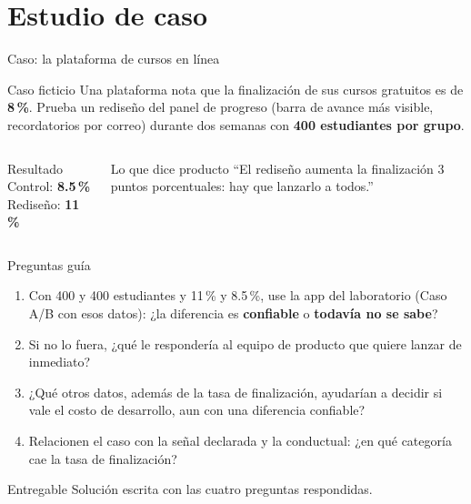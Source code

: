 \documentclass[aspectratio=169,xcolor=dvipsnames]{beamer}
\begin{document}
\section[Caso]{Estudio de caso}

\begin{frame}{Caso: la plataforma de cursos en línea}
\begin{exampleblock}{Caso ficticio}
  Una plataforma nota que la finalización de sus cursos gratuitos es de \textbf{8\,\%}. Prueba un rediseño del panel de progreso (barra de avance más visible, recordatorios por correo) durante dos semanas con \textbf{400 estudiantes por grupo}.
\end{exampleblock}
\begin{columns}[T]
  \begin{block}{Resultado}
    \small Control: \textbf{8.5\,\%}\\ Rediseño: \textbf{11\,\%}
  \end{block}
  \begin{alertblock}{Lo que dice producto}
    \small \enquote{El rediseño aumenta la finalización 3 puntos porcentuales: hay que lanzarlo a todos.}
  \end{alertblock}
\end{columns}
\end{frame}

\begin{frame}{Preguntas guía}
\small
\begin{enumerate}
  \item Con 400 y 400 estudiantes y 11\,\% y 8.5\,\%, use la app del laboratorio (Caso A/B con esos datos): ¿la diferencia es \textbf{confiable} o \textbf{todavía no se sabe}?
  \vspace{3pt}
  \item Si no lo fuera, ¿qué le respondería al equipo de producto que quiere lanzar de inmediato?
  \vspace{3pt}
  \item ¿Qué otros datos, además de la tasa de finalización, ayudarían a decidir si vale el costo de desarrollo, aun con una diferencia confiable?
  \vspace{3pt}
  \item Relacionen el caso con la señal declarada y la conductual: ¿en qué categoría cae la tasa de finalización?
\end{enumerate}
\begin{alertblock}{Entregable}
  \small Solución escrita con las cuatro preguntas respondidas.
\end{alertblock}
\end{frame}
\end{document}
